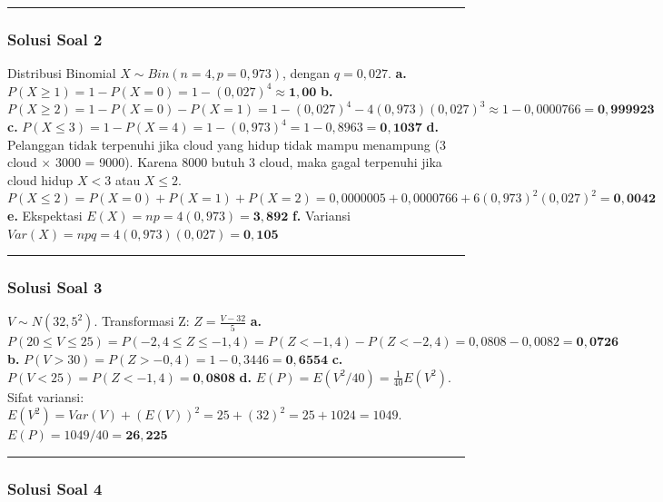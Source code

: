 \documentclass[
  letterpaper,
  DIV=11,
  numbers=noendperiod]{scrartcl}
\begin{document}
\begin{center}\rule{0.5\linewidth}{0.5pt}\end{center}

\subsubsection{\texorpdfstring{\textbf{Solusi Soal
2}}{Solusi Soal 2}}\label{solusi-soal-2}

Distribusi Binomial \(X \sim Bin(n=4, p=0,973)\), dengan \(q = 0,027\).
\textbf{a.}
\(P(X \ge 1) = 1 - P(X=0) = 1 - (0,027)^4 \approx \mathbf{1,00}\)
\textbf{b.}
\(P(X \ge 2) = 1 - P(X=0) - P(X=1) = 1 - (0,027)^4 - 4(0,973)(0,027)^3 \approx 1 - 0,0000766 = \mathbf{0,999923}\)
\textbf{c.}
\(P(X \le 3) = 1 - P(X=4) = 1 - (0,973)^4 = 1 - 0,8963 = \mathbf{0,1037}\)
\textbf{d.} Pelanggan tidak terpenuhi jika cloud yang hidup tidak mampu
menampung (3 cloud \(\times\) 3000 = 9000). Karena 8000 butuh 3 cloud,
maka gagal terpenuhi jika cloud hidup \(X < 3\) atau \(X \le 2\).
\(P(X \le 2) = P(X=0) + P(X=1) + P(X=2) = 0,0000005 + 0,0000766 + 6(0,973)^2(0,027)^2 = \mathbf{0,0042}\)
\textbf{e.} Ekspektasi \(E(X) = np = 4(0,973) = \mathbf{3,892}\)
\textbf{f.} Variansi \(Var(X) = npq = 4(0,973)(0,027) = \mathbf{0,105}\)

\begin{center}\rule{0.5\linewidth}{0.5pt}\end{center}

\subsubsection{\texorpdfstring{\textbf{Solusi Soal
3}}{Solusi Soal 3}}\label{solusi-soal-3}

\(V \sim N(32, 5^2)\). Transformasi Z: \(Z = \frac{V - 32}{5}\)
\textbf{a.}
\(P(20 \le V \le 25) = P(-2,4 \le Z \le -1,4) = P(Z < -1,4) - P(Z < -2,4) = 0,0808 - 0,0082 = \mathbf{0,0726}\)
\textbf{b.} \(P(V > 30) = P(Z > -0,4) = 1 - 0,3446 = \mathbf{0,6554}\)
\textbf{c.} \(P(V < 25) = P(Z < -1,4) = \mathbf{0,0808}\) \textbf{d.}
\(E(P) = E(V^2 / 40) = \frac{1}{40} E(V^2)\). Sifat variansi:
\(E(V^2) = Var(V) + (E(V))^2 = 25 + (32)^2 = 25 + 1024 = 1049\).
\(E(P) = 1049 / 40 = \mathbf{26,225}\)

\begin{center}\rule{0.5\linewidth}{0.5pt}\end{center}

\subsubsection{\texorpdfstring{\textbf{Solusi Soal
4}}{Solusi Soal 4}}\label{solusi-soal-4}
\end{document}
